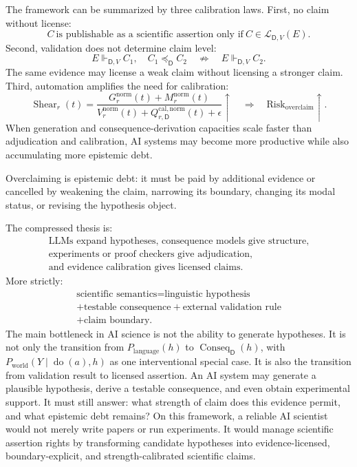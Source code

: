 \documentclass[11pt,a4paper]{article}
\newcommand{\doop}{\operatorname{do}}
\newcommand{\Conseq}{\operatorname{Conseq}}
\newcommand{\Shear}{\operatorname{Shear}}
\newcommand{\Dom}{\mathsf{D}}
\begin{document}
The framework can be summarized by three calibration laws. First, no claim without license:
\begin{equation}
C\ \text{is publishable as a scientific assertion only if}\ C\in\mathcal{L}_{\Dom,V}(E).
\end{equation}
Second, validation does not determine claim level:
\begin{equation}
E\Vdash_{\Dom,V} C_1,\quad C_1\preceq_{\Dom} C_2
\quad\not\Rightarrow\quad
E\Vdash_{\Dom,V} C_2.
\end{equation}
The same evidence may license a weak claim without licensing a stronger claim. Third, automation amplifies the need for calibration:
\begin{equation}
\Shear_r(t)=
\frac{
G^{\mathrm{norm}}_r(t)+M^{\mathrm{norm}}_r(t)
}{
V^{\mathrm{norm}}_r(t)+Q^{\mathrm{cal,norm}}_{r,\Dom}(t)+\epsilon
}
\uparrow
\quad\Rightarrow\quad
\mathrm{Risk}_{\mathrm{overclaim}}\uparrow.
\end{equation}
When generation and consequence-derivation capacities scale faster than adjudication and calibration, AI systems may become more productive while also accumulating more epistemic debt.

Overclaiming is epistemic debt: it must be paid by additional evidence or cancelled by weakening the claim, narrowing its boundary, changing its modal status, or revising the hypothesis object.

The compressed thesis is:
\[
\boxed{\begin{gathered}
\text{LLMs expand hypotheses, consequence models give structure,}\\
\text{experiments or proof checkers give adjudication,}\\
\text{and evidence calibration gives licensed claims.}
\end{gathered}}
\]
More strictly:
\[
\boxed{\begin{gathered}
\text{scientific semantics}=\text{linguistic hypothesis}\\
+\text{testable consequence}+\text{external validation rule}\\
+\text{claim boundary.}
\end{gathered}}
\]
The main bottleneck in AI science is not the ability to generate hypotheses. It is not only the transition from $P_{\mathrm{language}}(h)$ to $\Conseq_{\Dom}(h)$, with $P_{\mathrm{world}}(Y\mid \doop(a),h)$ as one interventional special case. It is also the transition from validation result to licensed assertion. An AI system may generate a plausible hypothesis, derive a testable consequence, and even obtain experimental support. It must still answer: what strength of claim does this evidence permit, and what epistemic debt remains? On this framework, a reliable AI scientist would not merely write papers or run experiments. It would manage scientific assertion rights by transforming candidate hypotheses into evidence-licensed, boundary-explicit, and strength-calibrated scientific claims.
\end{document}
